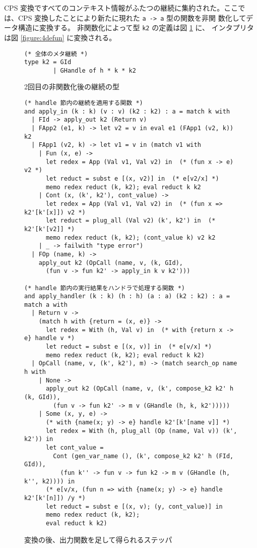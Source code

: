 CPS 変換ですべてのコンテキスト情報がふたつの継続に集約された。ここで
は、CPS 変換したことにより新たに現れた \texttt{a -> a} 型の関数を非関
数化してデータ構造に変換する。
非関数化によって型 \texttt{k2} の定義は図 \ref{figure:k2_4defun} に、
インタプリタは図 \ref{figure:4defun} に変換される。

\begin{figure}
\begin{spacing}{0.8}
\begin{verbatim}
(* 全体のメタ継続 *)
type k2 = GId
        | GHandle of h * k * k2
\end{verbatim}
\end{spacing}
\caption{2回目の非関数化後の継続の型}
\label{figure:k2_4defun}
\end{figure}

\begin{figure}
\begin{spacing}{0.8}
\begin{verbatim}
(* handle 節内の継続を適用する関数 *)
and apply_in (k : k) (v : v) (k2 : k2) : a = match k with
  | FId -> apply_out k2 (Return v)
  | FApp2 (e1, k) -> let v2 = v in eval e1 (FApp1 (v2, k)) k2
  | FApp1 (v2, k) -> let v1 = v in (match v1 with
    | Fun (x, e) ->
      let redex = App (Val v1, Val v2) in  (* (fun x -> e) v2 *)
      let reduct = subst e [(x, v2)] in  (* e[v2/x] *)
      memo redex reduct (k, k2); eval reduct k k2
    | Cont (x, (k', k2'), cont_value) ->
      let redex = App (Val v1, Val v2) in  (* (fun x => k2'[k'[x]]) v2 *)
      let reduct = plug_all (Val v2) (k', k2') in  (* k2'[k'[v2]] *)
      memo redex reduct (k, k2); (cont_value k) v2 k2
    | _ -> failwith "type error")
  | FOp (name, k) ->
    apply_out k2 (OpCall (name, v, (k, GId),
      (fun v -> fun k2' -> apply_in k v k2')))

(* handle 節内の実行結果をハンドラで処理する関数 *)
and apply_handler (k : k) (h : h) (a : a) (k2 : k2) : a = match a with
  | Return v ->
    (match h with {return = (x, e)} ->
      let redex = With (h, Val v) in  (* with {return x -> e} handle v *)
      let reduct = subst e [(x, v)] in  (* e[v/x] *)
      memo redex reduct (k, k2); eval reduct k k2)
  | OpCall (name, v, (k', k2'), m) -> (match search_op name h with
    | None ->
      apply_out k2 (OpCall (name, v, (k', compose_k2 k2' h (k, GId)),
        (fun v -> fun k2' -> m v (GHandle (h, k, k2')))))
    | Some (x, y, e) ->
      (* with {name(x; y) -> e} handle k2'[k'[name v]] *)
      let redex = With (h, plug_all (Op (name, Val v)) (k', k2')) in
      let cont_value =
        Cont (gen_var_name (), (k', compose_k2 k2' h (FId, GId)),
          (fun k'' -> fun v -> fun k2 -> m v (GHandle (h, k'', k2)))) in
      (* e[v/x, (fun n => with {name(x; y) -> e} handle k2'[k'[n]]) /y *)
      let reduct = subst e [(x, v); (y, cont_value)] in
      memo redex reduct (k, k2);
      eval reduct k k2)
\end{verbatim}
\end{spacing}
\caption{変換の後、出力関数を足して得られるステッパ}
\label{figure:5memo}
\end{figure}

